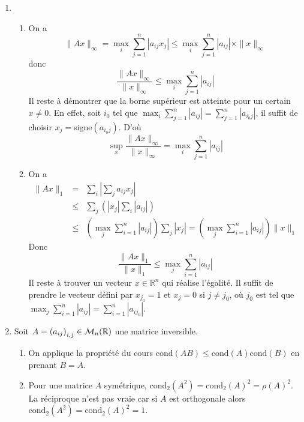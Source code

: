 \documentclass[a4paper]{article}
\begin{document}
\begin{enumerate}
\item 
\begin{enumerate}
\item On a 
\[ \| A x\|_\infty=\max_i\sum_{j=1}^n|a_{ij}x_j|\leq \max_i\sum_{j=1}^n|a_{ij}|\times \|x\|_\infty\]donc
\[ \frac{\| A x\|_\infty}{\|x\|_\infty}\leq\max_i\sum_{j=1}^n|a_{ij}|\]
Il reste à démontrer que la borne supérieur est atteinte pour un certain $x\neq 0$. En effet, soit $i_0$ tel que  $\max_i\sum_{j=1}^n|a_{ij}|=\sum_{j=1}^n|a_{i_0j}|$, il suffit de choisir $x_j=$signe$(a_{i_0j})$. D'où
 \[ \sup_x\frac{\| A x\|_\infty}{\|x\|_\infty}=\max_i\sum_{j=1}^n|a_{ij}|\]
\item On a 
\[ \begin{array}{ccl}
\|Ax \|_1&=&\displaystyle \sum_i|\sum_j a_{ij}x_j|\\
&\leq&\displaystyle \sum_j\left(|x_j|\sum_i |a_{ij}|\right)\\
&\leq&\displaystyle \left(\max_j\sum_{i=1}^n|a_{ij}|\right)\sum_j|x_j|=\left(\max_j\sum_{i=1}^n|a_{ij}|\right)\|x\|_1
\end{array} \]
Donc 
\[ \frac{\| A x\|_1}{\|x\|_1}\leq\max_j\sum_{i=1}^n|a_{ij}|\]
Il reste à trouver un vecteur $x \in \mathbb{R}^n$ qui réalise l'égalité. Il suffit de prendre le vecteur défini par $x_{j_0} = 1$ et $x_j = 0$ si $j\neq j_0$, où $j_0$ est tel que $\max_j\sum_{i=1}^n|a_{ij}|=\sum_{i=1}^n|a_{ij_0}|$.

\end{enumerate}
\item Soit $A=\left(a_{ij}\right)_{i,j}\in {\cal M}_n(\mathbb{R})$ une matrice inversible.
\begin{enumerate}
\item On applique la propriété du cours  $\mbox{cond}(AB)\leq \mbox{cond}(A) \mbox{cond}(B)$ en prenant $B=A$.
\item Pour une matrice  $A$ symétrique,  $\mbox{cond}_2(A^2)= \mbox{cond}_2(A)^2=\rho(A)^2$. La réciproque n'est pas vraie car si $A$ est orthogonale alors $\mbox{cond}_2(A^2)= \mbox{cond}_2(A)^2=1$.

\end{enumerate}
\end{enumerate}








\end{document}
